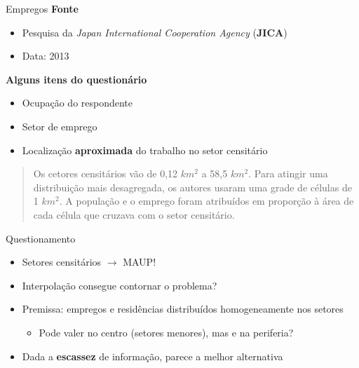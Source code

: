 \documentclass[
  ignorenonframetext,
  aspectratio=169]{beamer}
\providecommand{\tightlist}{%
  \setlength{\itemsep}{0pt}\setlength{\parskip}{0pt}}
\begin{document}
\begin{frame}{Empregos}
\protect\hypertarget{empregos}{}
\textbf{Fonte}

\begin{itemize}
\tightlist
\item
  Pesquisa da \emph{Japan International Cooperation Agency}
  (\textbf{JICA})
\item
  Data: 2013
\end{itemize}

\textbf{Alguns itens do questionário}

\begin{itemize}
\tightlist
\item
  Ocupação do respondente
\item
  Setor de emprego
\item
  Localização \textbf{aproximada} do trabalho no setor censitário
\end{itemize}

\begin{quote}
Os cetores censitários vão de 0,12 \(km^2\) a 58,5 \(km^2\). Para
atingir uma distribuição mais desagregada, os autores usaram uma grade
de células de 1 \(km^2\). A população e o emprego foram atribuídos em
proporção à área de cada célula que cruzava com o setor censitário.
\end{quote}
\end{frame}

\begin{frame}{Questionamento}
\protect\hypertarget{questionamento}{}
\begin{itemize}
\tightlist
\item
  Setores censitários \(\rightarrow\) MAUP!
\item
  Interpolação consegue contornar o problema?
\item
  Premissa: empregos e residências distribuídos homogeneamente nos
  setores

  \begin{itemize}
  \tightlist
  \item
    Pode valer no centro (setores menores), mas e na periferia?
  \end{itemize}
\item
  Dada a \textbf{escassez} de informação, parece a melhor alternativa
\end{itemize}
\end{frame}
\end{document}

